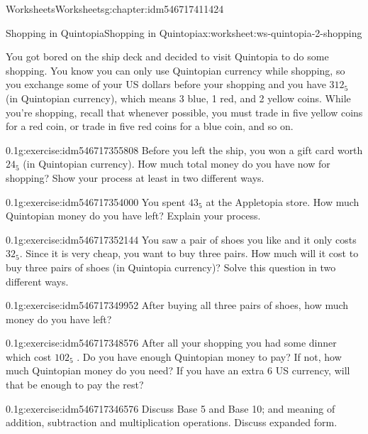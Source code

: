 \documentclass[twoside,11pt,]{book}
\begin{document}
\begin{chapterptx}{Worksheets}{}{Worksheets}{}{}{g:chapter:idm546717411424}
\begin{worksheet-section-numberless}{Shopping in Quintopia}{}{Shopping in Quintopia}{}{}{x:worksheet:ws-quintopia-2-shopping}
\begin{introduction}{}%
You got bored on the ship deck and decided to visit Quintopia to do some shopping. You know you can only use Quintopian currency while shopping, so you exchange some of your US dollars before your shopping and you have \(312_{5}\) (in Quintopian currency), which means 3 blue, 1 red, and 2 yellow coins. While you’re shopping, recall that whenever possible, you must trade in five yellow coins for a red coin, or trade in five red coins for a blue coin, and so on.%
\end{introduction}%
\begin{divisionexercise}{1}{}{0.1}{g:exercise:idm546717355808}%
Before you left the ship, you won a gift card worth \(24_{5}\) (in Quintopian currency). How much total money do you have now for shopping? Show your process at least in two different ways.%
\end{divisionexercise}%
\begin{divisionexercise}{2}{}{0.1}{g:exercise:idm546717354000}%
You spent \(43_{5}\) at the Appletopia store. How much Quintopian money do you have left?  Explain your process.%
\end{divisionexercise}%
\begin{divisionexercise}{3}{}{0.1}{g:exercise:idm546717352144}%
You saw a pair of shoes you like and it only costs \(32_{5}\). Since it is very cheap, you want to buy three pairs. How much will it cost to buy three pairs of shoes (in Quintopia currency)? Solve this question in two different ways.%
\end{divisionexercise}%
\clearpage
\begin{divisionexercise}{4}{}{0.1}{g:exercise:idm546717349952}%
After buying all three pairs of shoes, how much money do you have left?%
\end{divisionexercise}%
\begin{divisionexercise}{5}{}{0.1}{g:exercise:idm546717348576}%
After all your shopping you had some dinner which cost \(102_{5}\) . Do you have enough Quintopian money to pay? If not, how much Quintopian money do you need?  If you have an extra \textdollar{}6 US currency, will that be enough to pay the rest?%
\end{divisionexercise}%
\begin{divisionexercise}{6}{}{0.1}{g:exercise:idm546717346576}%
Discuss Base 5 and Base 10; and meaning of addition, subtraction and multiplication operations. Discuss expanded form.%
\end{divisionexercise}%
\end{worksheet-section-numberless}

\end{chapterptx}
\end{document}
